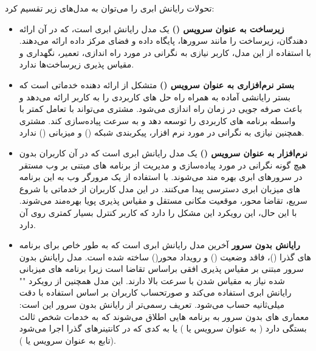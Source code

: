 تحولات رایانش ابری را می‌توان به مدل‌های زیر تقسیم کرد:

\begin{itemize}
	
	\item \textbf{زیرساخت به عنوان سرویس ()} یک مدل رایانش ابری است، که در آن ارائه دهندگان، زیرساخت را مانند سرورها، پایگاه داده و فضای مرکز داده ارائه می‌دهند. با استفاده از این مدل، کاربر نیازی به نگرانی در مورد راه اندازی، تعمیر، نگهداری و مقیاس پذیری زیرساخت‌ها ندارد.
	
	\item \textbf{بستر نرم‌افزاری به عنوان سرویس ()} متشکل از ارائه دهنده خدماتی است که بستر رایانشی آماده به همراه راه حل های کاربردی را به کاربر ارائه می‌دهد و باعث صرفه جویی در زمان راه اندازی می‌شود. مشتری می‌تواند با تعامل کمتر با واسطه برنامه های کاربردی را توسعه دهد و به سرعت پیاده‌سازی کند. مشتری همچنین نیازی به نگرانی در مورد نرم افزار، پیکربندی شبکه () و میزبانی () ندارد.
	
	\item \textbf{نرم‌افزار به عنوان سرویس ()} یک مدل رایانش ابری است که در آن کاربران بدون هیچ گونه نگرانی در مورد پیاده‌سازی و مدیریت از برنامه های مبتنی بر وب مستقر در سرورهای ابری بهره مند می‌شوند. با استفاده از یک مرورگر وب به این برنامه های میزبان ابری دسترسی پیدا می‌کنند. در این مدل کاربران از خدماتی با شروع سریع، تقاضا محور، موقعیت مکانی مستقل و مقیاس پذیری پویا بهره‌مند می‌شوند. با این حال، این رویکرد این مشکل را دارد که کاربر کنترل بسیار کمتری روی آن دارد.
	
	\item \textbf{رایانش بدون سرور} آخرین مدل رایانش ابری است که به طور خاص برای برنامه های گذرا ()، فاقد وضعیت () و رویداد محور() ساخته شده است. مدل رایانش بدون سرور مبتنی بر مقیاس پذیری افقی براساس تقاضا است زیرا برنامه های میزبانی شده نیاز به مقیاس شدن با سرعت بالا دارند. این مدل همچنین از رویکرد "" رایانش ابری استفاده می‌کند و صورتحساب کاربران بر اساس استفاده با دقت میلی‌ثانیه حساب می‌شود. تعریف رسمی‌تر از رایانش بدون سرور این است: معماری های بدون سرور به برنامه هایی اطلاق می‌شوند که به خدمات شخص ثالث بستگی دارد ( به عنوان سرویس یا ) یا به کدی که در کانتینرهای گذرا اجرا می‌شود (تابع به عنوان سرویس یا ).
	
\end{itemize}

